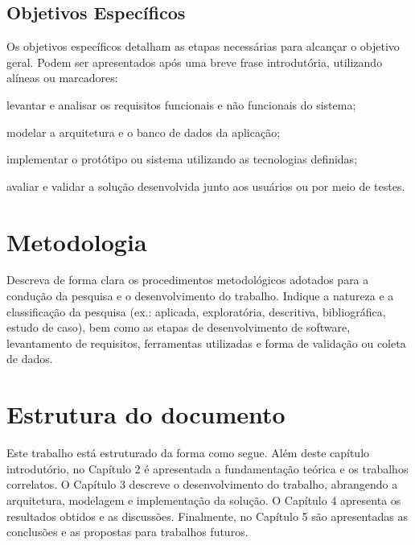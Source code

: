 \subsection{Objetivos Específicos}
Os objetivos específicos detalham as etapas necessárias para alcançar o objetivo geral. Podem ser apresentados após uma breve frase introdutória, utilizando alíneas ou marcadores:
\begin{uemaball}
    \item levantar e analisar os requisitos funcionais e não funcionais do sistema;
    \item modelar a arquitetura e o banco de dados da aplicação;
    \item implementar o protótipo ou sistema utilizando as tecnologias definidas;
    \item avaliar e validar a solução desenvolvida junto aos usuários ou por meio de testes.
\end{uemaball}

\section{Metodologia}
Descreva de forma clara os procedimentos metodológicos adotados para a condução da pesquisa e o desenvolvimento do trabalho. Indique a natureza e a classificação da pesquisa (ex.: aplicada, exploratória, descritiva, bibliográfica, estudo de caso), bem como as etapas de desenvolvimento de software, levantamento de requisitos, ferramentas utilizadas e forma de validação ou coleta de dados.

\section{Estrutura do documento}
Este trabalho está estruturado da forma como segue. Além deste capítulo introdutório, no Capítulo 2 é apresentada a fundamentação teórica e os trabalhos correlatos. O Capítulo 3 descreve o desenvolvimento do trabalho, abrangendo a arquitetura, modelagem e implementação da solução. O Capítulo 4 apresenta os resultados obtidos e as discussões. Finalmente, no Capítulo 5 são apresentadas as conclusões e as propostas para trabalhos futuros.
